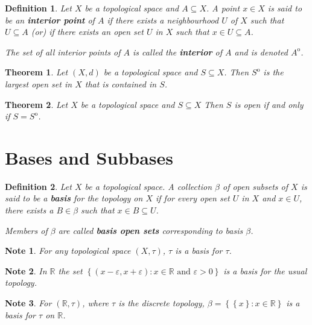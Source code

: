 \documentclass[12pt,twoside]{report}
\newtheorem{defn}{Definition}
\newtheorem{note}{Note}
\newtheorem{thm}{Theorem}
\begin{document}
\begin{defn}
    Let $X$ be a topological space and $A \subseteq X$. A point $x \in X$ is said to be an \textbf{interior point} of $A$ if there exists a neighbourhood $U$ of $X$ such that $U \subseteq A$ (or) if there exists an open set $U$ in $X$ such that $x \in U \subseteq A$. 

The set of all interior points of $A$ is called the \textbf{interior} of $A$ and is denoted $A ^\mathrm{o}$.
\end{defn}

\begin{thm}
    Let $\left (X, d\right )$ be a topological space and $S \subseteq X$. Then $S ^\mathrm{o}$ is the largest open set in $X$ that is contained in $S$.
\end{thm}

\begin{thm}
    Let $X$ be a topological space and $S \subseteq X$ Then $S$ is open if and only if $S = S ^\mathrm{o}$.
\end{thm}

\section{Bases and Subbases}

\begin{defn}
    Let $X$ be a topological space. A collection $\beta$ of open subsets of $X$ is said to be a \textbf{basis} for the topology on $X$ if for every open set $U$ in $X$ and $x \in U$, there exists a $B \in \beta$ such that $x \in B \subseteq U$.

    Members of $\beta$ are called \textbf{basis open sets} corresponding to basis $\beta$.
\end{defn}

\begin{note}
    For any topological space $\left (X, \tau\right )$, $\tau$ is a basis for $\tau$.
\end{note}

\begin{note}
    In $\mathbb{R}$ the set $\left\{ \left (x - \varepsilon, x + \varepsilon\right )  :  x \in \mathbb{R}\text{ and }\varepsilon >0 \right\}$ is a basis for the usual topology.
\end{note}

\begin{note}
    For $\left (\mathbb{R}, \tau\right )$, where $\tau$ is the discrete topology, $\beta = \left\{ \left\{ x \right\}  :  x \in \mathbb{R} \right\}$ is a basis for $\tau$ on $\mathbb{R}$.
\end{note}
\end{document}
